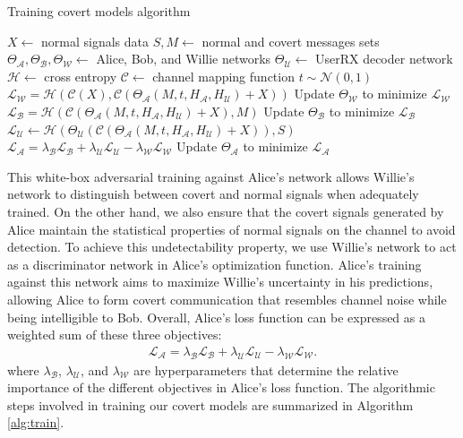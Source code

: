 \begin{algorithm}[tp!]
	\caption{Training covert models algorithm}\label{alg:train}
	\small
	\begin{algorithmic}
		\State $X \gets$ normal signals data
		\State $S, M \gets$ normal and covert messages sets
		\State $\Theta_{\mathcal{A}}, \Theta_{\mathcal{B}}, \Theta_{\mathcal{W}} \gets$ Alice, Bob, and Willie networks
		\State $\Theta_{\mathcal{U}} \gets$ UserRX decoder network
		\State $\mathcal{H} \gets$ cross entropy 
		\State $\mathcal{C} \gets$ channel mapping function
		\State $t \sim \mathcal{N}(0, 1)$
		\State $\mathcal{L}_{\mathcal{W}} = \mathcal{H}(\mathcal{C}(X), \mathcal{C}(\Theta_{\mathcal{A}}(M, t, H_{\mathcal{A}}, H_{\mathcal{U}}) + X))$
		\State Update $\Theta_{\mathcal{W}}$ to minimize $\mathcal{L}_{\mathcal{W}}$
		\State $\mathcal{L}_{\mathcal{B}} = \mathcal{H}(\mathcal{C}(\Theta_{\mathcal{A}}(M, t, H_{\mathcal{A}}, H_{\mathcal{U}}) + X), M)$
		\State Update $\Theta_{\mathcal{B}}$ to minimize $\mathcal{L}_{\mathcal{B}}$
		\State $\mathcal{L}_{\mathcal{U}} \gets \mathcal{H}(\Theta_{\mathcal{U}}(\mathcal{C}(\Theta_{\mathcal{A}}(M, t, H_{\mathcal{A}}, H_{\mathcal{U}}) + X)), S)$
		\State
		$\mathcal{L}_{\mathcal{A}} = \lambda_{\mathcal{B}} \mathcal{L}_{\mathcal{B}} + \lambda_{\mathcal{U}} \mathcal{L}_{\mathcal{U}} - \lambda_{\mathcal{W}} \mathcal{L}_{\mathcal{W}}$
		\State Update $\Theta_{\mathcal{A}}$ to minimize $\mathcal{L}_{\mathcal{A}}$
		\EndFor
	\end{algorithmic}
\end{algorithm}

This white-box adversarial training against Alice's network allows Willie's network to distinguish between covert and normal signals when adequately trained. On the other hand, we also ensure that the covert signals generated by Alice maintain the statistical properties of normal signals on the channel to avoid detection. To achieve this undetectability property, we use Willie's network to act as a discriminator network in Alice's optimization function. Alice's training against this network aims to maximize Willie's uncertainty in his predictions, allowing Alice to form covert communication that resembles channel noise while being intelligible to Bob. Overall, Alice's loss function can be expressed as a weighted sum of these three objectives:
\begin{equation}
	\begin{array}{l} \label{alice_loss}
		\mathcal{L}_{\mathcal{A}} = \lambda_{\mathcal{B}} \mathcal{L}_{\mathcal{B}} + \lambda_{\mathcal{U}} \mathcal{L}_{\mathcal{U}} - \lambda_{\mathcal{W}} \mathcal{L}_{\mathcal{W}}.
	\end{array}
\end{equation}
where \(\lambda_{\mathcal{B}}\), \(\lambda_{\mathcal{U}}\), and \(\lambda_{\mathcal{W}}\) are hyperparameters that determine the relative importance of the different objectives in Alice's loss function. The algorithmic steps involved in training our covert models are summarized in Algorithm \ref{alg:train}.


